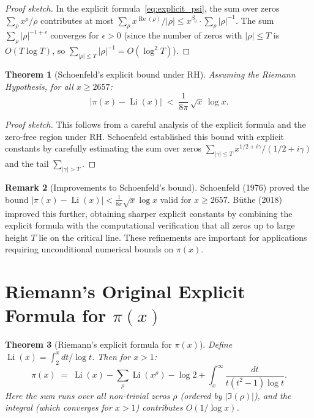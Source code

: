 \documentclass[12pt,a4paper]{amsart}
\newtheorem{theorem}{Theorem}[section]
\theoremstyle{definition}
\newtheorem{remark}[theorem]{Remark}
\DeclareMathOperator{\Re}{Re}
\DeclareMathOperator{\Li}{Li}
\begin{document}
\begin{proof}[Proof sketch]
In the explicit formula~\eqref{eq:explicit_psi}, the sum over zeros
$\sum_\rho x^\rho/\rho$ contributes at most
$\sum_\rho x^{\Re(\rho)}/|\rho| \le x^{\beta_0} \cdot \sum_\rho |\rho|^{-1}$.
The sum $\sum_\rho |\rho|^{-1+\epsilon}$ converges for $\epsilon > 0$
(since the number of zeros with $|\rho| \le T$ is $O(T\log T)$, so
$\sum_{|\rho|\le T} |\rho|^{-1} = O(\log^2 T)$).
\end{proof}

\begin{theorem}[Schoenfeld's explicit bound under RH]
\label{thm:schoenfeld}
Assuming the Riemann Hypothesis, for all $x \ge 2657$:
\[
  |\pi(x) - \Li(x)| \;<\; \frac{1}{8\pi}\,\sqrt{x}\,\log x.
\]
\end{theorem}

\begin{proof}[Proof sketch]
This follows from a careful analysis of the explicit formula and the
zero-free region under RH.  Schoenfeld \cite{Schoenfeld1976} established
this bound with explicit constants by carefully estimating the sum over
zeros $\sum_{|\gamma| \le T} x^{1/2+i\gamma}/(1/2+i\gamma)$ and the
tail $\sum_{|\gamma| > T}$.
\end{proof}

\begin{remark}[Improvements to Schoenfeld's bound]
Schoenfeld (1976) proved the bound $|\pi(x) - \Li(x)| < \tfrac{1}{8\pi}\sqrt{x}\log x$
valid for $x \ge 2657$.  B\"uthe (2018) improved this further, obtaining
sharper explicit constants by combining the explicit formula with the
computational verification that all zeros up to large height $T$ lie on the
critical line.  These refinements are important for applications requiring
unconditional numerical bounds on $\pi(x)$.
\end{remark}

\section{Riemann's Original Explicit Formula for \texorpdfstring{$\pi(x)$}{pi(x)}}

\begin{theorem}[Riemann's explicit formula for $\pi(x)$]
\label{thm:riemann_explicit}
Define $\Li(x) = \int_2^x dt/\log t$.  Then for $x > 1$:
\begin{equation}
  \label{eq:riemann_explicit}
  \pi(x) \;=\; \Li(x) - \sum_\rho \Li(x^\rho) - \log 2
  + \int_x^{\infty} \frac{dt}{t(t^2-1)\log t}.
\end{equation}
Here the sum runs over all non-trivial zeros $\rho$ (ordered by
$|\Im(\rho)|$), and the integral (which converges for $x > 1$)
contributes $O(1/\log x)$.
\end{theorem}
\end{document}
